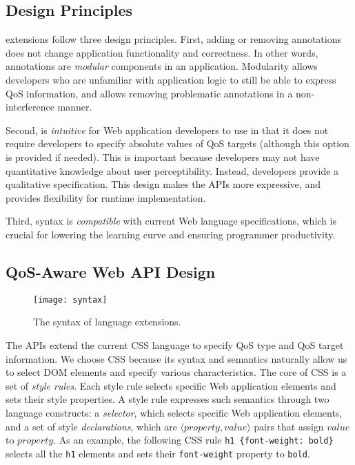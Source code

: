 \subsection{Design Principles}
\label{sec:lang:spec:principles}

\greenweb extensions follow three design principles. First, adding or removing \greenweb annotations does not change application functionality and correctness. In other words, \greenweb annotations are \textit{modular} components in an application. Modularity allows developers who are unfamiliar with application logic to still be able to express QoS information, and allows removing problematic annotations in a non-interference manner.

Second, \greenweb is \textit{intuitive} for Web application developers to use in that it does not require developers to specify absolute values of QoS targets (although this option is provided if needed). This is important because developers may not have quantitative knowledge about user perceptibility. Instead, developers provide a qualitative specification. This design makes the APIs more expressive, and provides flexibility for runtime implementation. 

Third, \greenweb syntax is \textit{compatible} with current Web language specifications, which is crucial for lowering the learning curve and ensuring programmer productivity.

\subsection{QoS-Aware Web API Design}
\label{sec:lang:spec:api}



\begin{figure}[t]
  \centering
  \texttt{[image: syntax]}
  \caption{The syntax of \greenweb language extensions.}
  \label{fig:syntax}
\end{figure}

The \greenweb APIs extend the current CSS language to specify QoS type and QoS target information. We choose CSS because its syntax and semantics naturally allow us to select DOM elements and specify various characteristics. The core of CSS is a set of \textit{style rules}. Each style rule selects specific Web application elements and sets their style properties. A style rule expresses such semantics through two language constructs: a \textit{selector}, which selects specific Web application elements, and a set of style \textit{declarations}, which are $\langle property, value \rangle$ pairs that assign $value$ to $property$. As an example, the following CSS rule \texttt{h1 \{font-weight: bold\}} selects all the \texttt{h1} elements and sets their \texttt{font-weight} property to \texttt{bold}.

